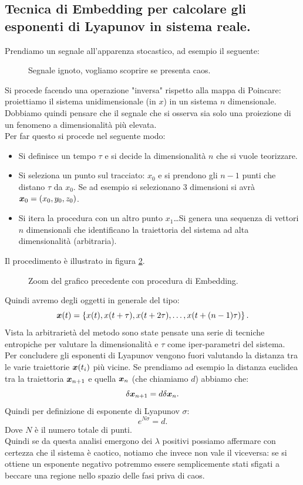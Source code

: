 \subsection{Tecnica di Embedding per calcolare gli esponenti di Lyapunov in sistema reale.}%
\label{sub:Tecnica di Embedding per calcolare gli esponenti di Lyapunov in sistema reale.}
Prendiamo un segnale all'apparenza stocastico, ad esempio il seguente:
\begin{figure}[H]
    \centering
    \caption{\scriptsize Segnale ignoto, vogliamo scoprire se presenta caos.}
    \label{fig:21_caos_signal}
\end{figure}
\noindent
Si procede facendo una operazione "inversa" rispetto alla mappa di Poincare: proiettiamo il sistema unidimensionale (in $x$) in un sistema $n$ dimensionale. \\
Dobbiamo quindi pensare che il segnale che si osserva sia solo una proiezione di un fenomeno a dimensionalità più elevata.\\
Per far questo si procede nel seguente modo:
\begin{itemize}
    \item Si definisce un tempo $\tau$ e si decide la dimensionalità $n$ che si vuole teorizzare.
    \item Si seleziona un punto sul tracciato: $x_0$ e si prendono gli $n-1$ punti che distano $\tau$ da $x_0$. Se ad esempio si selezionano 3 dimensioni si avrà $\boldsymbol{x}_0 = (x_0, y_0, z_0)$.
    \item Si itera la procedura con un altro punto $x_1$\ldots Si genera una sequenza di vettori $n$ dimensionali che identificano la traiettoria del sistema ad alta dimensionalità (arbitraria).
\end{itemize}
Il procedimento è illustrato in figura \ref{fig:21_embed}.
\begin{figure}[H]
    \centering
    \caption{\scriptsize Zoom del grafico precedente con procedura di Embedding.}
    \label{fig:21_embed}
\end{figure}
\noindent
Quindi avremo degli oggetti in generale del tipo:
\[
    \boldsymbol{x} (t)= \left\{x(t), x(t+\tau), x(t+2\tau), \ldots, x(t+(n-1)\tau) \right\}
.\] 
Vista la arbitrarietà del metodo sono state pensate una serie di tecniche entropiche per valutare la dimensionalità e $\tau$ come iper-parametri del sistema.\\
Per concludere gli esponenti di Lyapunov vengono fuori valutando la distanza tra le varie traiettorie $\boldsymbol{x} (t_i)$ più vicine. Se prendiamo ad esempio la distanza euclidea tra la traiettoria $\boldsymbol{x}_{n+1}$ e quella $\boldsymbol{x}_n$ (che chiamiamo $d$) abbiamo che:
\[
    \delta\boldsymbol{x}_{n+1} = d \delta\boldsymbol{x}_n
.\] 
Quindi per definizione di esponente di Lyapunov $\sigma$:
\[
    e^{N\sigma} = d
.\] 
Dove $N$ è il numero totale di punti.\\
Quindi se da questa analisi emergono dei $\lambda$ positivi possiamo affermare con certezza che il sistema è caotico, notiamo che invece non vale il viceversa: se si ottiene un esponente negativo potremmo essere semplicemente stati sfigati a beccare una regione nello spazio delle fasi priva di caos.
\clearpage
